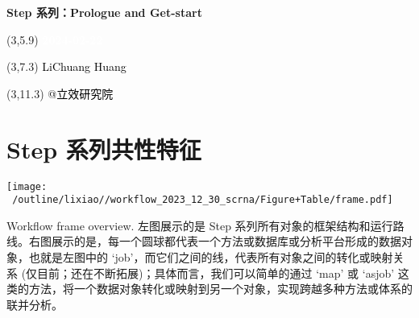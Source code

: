\documentclass[
]{article}
\author{}
\date{\vspace{-2.5em}}
\begin{document}
\begin{titlepage} 
\begin{center} \textbf{\Huge Step 系列：Prologue
and Get-start} \vspace{4em}
\begin{textblock}{10}(3,5.9) \huge
\textbf{\textcolor{white}{2024-02-22}}
\end{textblock} \begin{textblock}{10}(3,7.3)
\Large \textcolor{black}{LiChuang Huang}
\end{textblock} \begin{textblock}{10}(3,11.3)
\Large \textcolor{black}{@立效研究院}
\end{textblock} \end{center} \end{titlepage}
\restoregeometry


\tableofcontents

\listoftables

\newpage


\hypertarget{step}{%
\section{Step 系列共性特征}\label{step}}



\def\@captype{figure}
\begin{center}
\texttt{[image: ~/outline/lixiao//workflow\_2023\_12\_30\_scrna/Figure+Table/frame.pdf]}
\caption{Workflow frame overview. 左图展示的是 Step 系列所有对象的框架结构和运行路线。右图展示的是，每一个圆球都代表一个方法或数据库或分析平台形成的数据对象，也就是左图中的 `job'，而它们之间的线，代表所有对象之间的转化或映射关系 (仅目前；还在不断拓展)；具体而言，我们可以简单的通过 `map' 或 `asjob' 这类的方法，将一个数据对象转化或映射到另一个对象，实现跨越多种方法或体系的联并分析。}\label{fig:Workflow frame overview. 左图展示的是 Step 系列所有对象的框架结构和运行路线。右图展示的是，每一个圆球都代表一个方法或数据库或分析平台形成的数据对象，也就是左图中的 `job'，而它们之间的线，代表所有对象之间的转化或映射关系 (仅目前；还在不断拓展)；具体而言，我们可以简单的通过 `map' 或 `asjob' 这类的方法，将一个数据对象转化或映射到另一个对象，实现跨越多种方法或体系的联并分析。}
\end{center}
\end{document}
